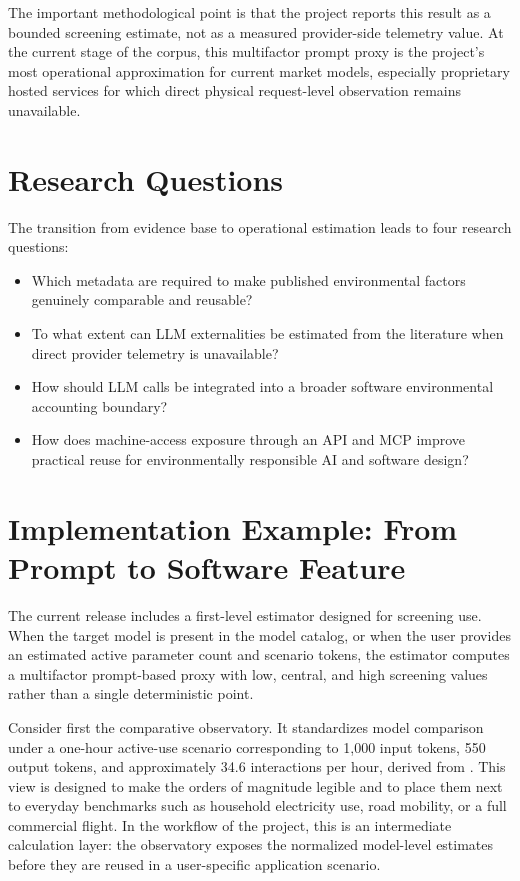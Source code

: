 \documentclass[11pt,a4paper]{article}
\begin{document}
The important methodological point is that the project reports this result as a bounded screening estimate, not as a measured provider-side telemetry value. At the current stage of the corpus, this multifactor prompt proxy is the project's most operational approximation for current market models, especially proprietary hosted services for which direct physical request-level observation remains unavailable.

\section{Research Questions}
The transition from evidence base to operational estimation leads to four research questions:
\begin{itemize}
\item Which metadata are required to make published environmental factors genuinely comparable and reusable?
\item To what extent can LLM externalities be estimated from the literature when direct provider telemetry is unavailable?
\item How should LLM calls be integrated into a broader software environmental accounting boundary?
\item How does machine-access exposure through an API and MCP improve practical reuse for environmentally responsible AI and software design?
\end{itemize}

\section{Implementation Example: From Prompt to Software Feature}
The current release includes a first-level estimator designed for screening use. When the target model is present in the model catalog, or when the user provides an estimated active parameter count and scenario tokens, the estimator computes a multifactor prompt-based proxy with low, central, and high screening values rather than a single deterministic point.

Consider first the comparative observatory. It standardizes model comparison under a one-hour active-use scenario corresponding to 1,000 input tokens, 550 output tokens, and approximately 34.6 interactions per hour, derived from \cite{brysbaert2019}. This view is designed to make the orders of magnitude legible and to place them next to everyday benchmarks such as household electricity use, road mobility, or a full commercial flight. In the workflow of the project, this is an intermediate calculation layer: the observatory exposes the normalized model-level estimates before they are reused in a user-specific application scenario.
\end{document}
